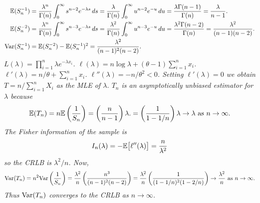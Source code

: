 \begin{exercise}
\begin{questions}
\begin{answer}
\ben
\it %
\begin{align*}
\mathbb{E}(S_n^{-1}) 
	& = \frac{\lambda^n}{\Gamma(n)}\int_0^\infty s^{n-2}e^{-\lambda s}\,ds
	= \frac{\lambda}{\Gamma(n)}\int_0^\infty u^{n-2}e^{-u}\,du 
	= \frac{\lambda\Gamma(n-1)}{\Gamma(n)} = \frac{\lambda}{n-1}. \\
\mathbb{E}(S_n^{-2}) 
	& = \frac{\lambda^n}{\Gamma(n)}\int_0^\infty s^{n-3}e^{-\lambda s}\,ds 
	= \frac{\lambda^2}{\Gamma(n)}\int_0^\infty u^{n-3}e^{-u}\,du 
	= \frac{\lambda^2\Gamma(n-2)}{\Gamma(n)} = \frac{\lambda^2}{(n-1)(n-2)}. \\
\text{Var}(S_n^{-1})
	& = \mathbb{E}(S_n^{-2}) -\mathbb{E}(S_n^{-1})^2 =  \frac{\lambda^2}{(n-1)^2(n-2)}.
\end{align*}
\it %
\bit
\it $L(\lambda) = \prod_{i=1}^n \lambda e^{-\lambda x_i}$.
\it $\ell(\lambda) = n\log\lambda + (\theta-1)\sum_{i=1}^n x_i$.
\it $\ell'(\lambda) = n/\theta + \sum_{i=1}^n x_i$.
\it $\ell''(\lambda) = -n/\theta^2 < 0$.
\eit
Setting $\ell'(\lambda)=0$ we obtain $T=n/\sum_{i=1}^n X_i$ as the MLE of $\lambda$.
\it %
$T_n$ is an asymptotically unbiased estimator for $\lambda$ because
\[
\mathbb{E}(T_n) 
	= n\mathbb{E}\left(\frac{1}{S_n}\right) 
	= \left(\frac{n}{n-1}\right)\lambda.
	= \left(\frac{1}{1-1/n}\right)\lambda
	\to \lambda \text{ as $n\to\infty$.}
\]
\it %
The Fisher information of the sample is
\[
I_n(\lambda) = -\mathbb{E}\big[\ell''(\lambda)\big] = \frac{n}{\lambda^2}
\]
so the CRLB is $\lambda^2/n$. Now,
\[
\text{Var}(T_n) 
	= n^2\text{Var}\left(\frac{1}{S_n}\right) 
	= \frac{\lambda^2}{n}\left(\frac{n^3}{(n-1)^2(n-2)}\right)
	= \frac{\lambda^2}{n}\left(\frac{1}{(1-1/n)^2(1-2/n)}\right)
	\to \frac{\lambda^2}{n} \text{ as $n\to\infty$.}
\]
Thus $\text{Var}(T_n)$ converges to the CRLB as $n\to\infty$.
\een
\end{answer}

\end{questions}
\end{exercise}

\endinput
